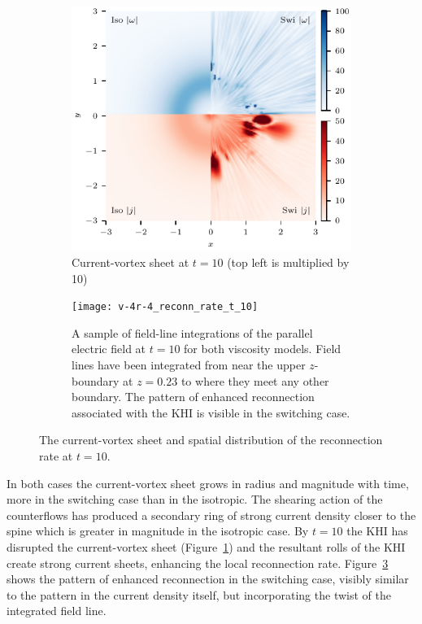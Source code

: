 \begin{figure}[t]
  \centering
    \begin{subfigure}{0.48\textwidth}
      \includegraphics[width=\linewidth]{v-4r-4_vorticity_current_ring_t_10}
      \caption{Current-vortex sheet at $t=10$ (top left is multiplied by 10)}
      \label{fig:v-4r-4_vorticity_current_ring_t_10}
    \end{subfigure}
    \hfill
    \begin{subfigure}{0.48\textwidth}
      \texttt{[image: v-4r-4\_reconn\_rate\_t\_10]}
      \caption{A sample of field-line integrations of the parallel electric field at $t=10$ for both viscosity models. Field lines have been integrated from near the upper $z$-boundary at $z=0.23$ to where they meet any other boundary. The pattern of enhanced reconnection associated with the KHI is visible in the switching case.}
      \label{fig:v-4r-4_reconn_rate_t_10}
    \end{subfigure}
\caption{The current-vortex sheet and spatial distribution of the reconnection rate at $t=10$.}
\end{figure}


In both cases the current-vortex sheet grows in radius and magnitude with time, more in the switching case than in the isotropic. The shearing action of the counterflows has produced a secondary ring of strong current density closer to the spine which is greater in magnitude in the isotropic case. By $t=10$ the KHI has disrupted the current-vortex sheet (Figure~\ref{fig:v-4r-4_vorticity_current_ring_t_10}) and the resultant rolls of the KHI create strong current sheets, enhancing the local reconnection rate. Figure~\ref{fig:v-4r-4_reconn_rate_t_10} shows the pattern of enhanced reconnection in the switching case, visibly similar to the pattern in the current density itself, but incorporating the twist of the integrated field line.

